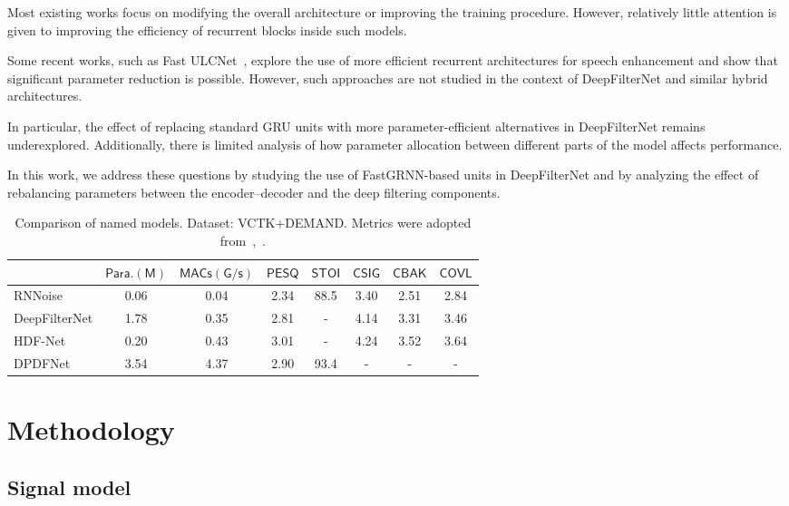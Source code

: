 \documentclass[a4paper,12pt]{extarticle}
\begin{document}
Most existing works focus on modifying the overall architecture or improving the training procedure. However, relatively
little attention is given to improving the efficiency of recurrent blocks inside such models.

Some recent works, such as Fast ULCNet~\cite{fastulcnet}, explore the use of more efficient recurrent architectures for
speech enhancement and show that significant parameter reduction is possible. However, such approaches are not studied
in the context of DeepFilterNet and similar hybrid architectures.

In particular, the effect of replacing standard GRU units with more parameter-efficient alternatives in DeepFilterNet
remains underexplored. Additionally, there is limited analysis of how parameter allocation between different parts of
the model affects performance.

In this work, we address these questions by studying the use of FastGRNN-based units in DeepFilterNet and by analyzing
the effect of rebalancing parameters between the encoder--decoder and the deep filtering components.

\begin{table}[h]
	\caption{Comparison of named models. Dataset: VCTK+DEMAND. Metrics were adopted from~\cite{hdfnet},~\cite{dpdfnet}.}
	\label{table:models}
	\footnotesize
	\centering
	\begin{tabular}{lccccccc}		
	\toprule
	 & $\mathsf{Para.(M)}$ & $\mathsf{MACs(G/s)}$ & $\mathsf{PESQ}$ & $\mathsf{STOI}$ & $\mathsf{CSIG}$ & $\mathsf{CBAK}$ & $\mathsf{COVL}$ \\
	\midrule
	RNNoise & 0.06 & 0.04 & 2.34 & 88.5 & 3.40 & 2.51 & 2.84 \\
	DeepFilterNet & 1.78 & 0.35 & 2.81 & - & 4.14 & 3.31 & 3.46 \\
	HDF-Net & 0.20 & 0.43 & 3.01 & - & 4.24 & 3.52 & 3.64 \\
	DPDFNet & 3.54 & 4.37 & 2.90 & 93.4 & - & - & - \\
	\bottomrule
	\end{tabular}
\end{table}


\section{Methodology}

\subsection{Signal model}
\end{document}
